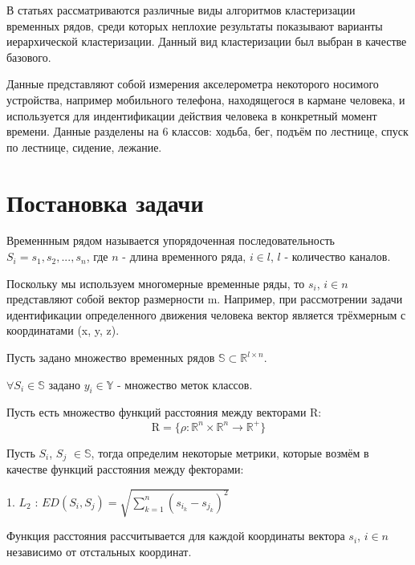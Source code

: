 \documentclass[12pt,twoside]{article}
\begin{document}
        В статьях \cite{WARRENLIAO20051857} \cite{AGHABOZORGI201516} рассматриваются различные виды алгоритмов кластеризации временных рядов,
        среди которых неплохие результаты показывают варианты иерархической кластеризации.
        Данный вид кластеризации был выбран в качестве базового.
        
        Данные \cite{Kwapisz:2011:ARU:1964897.1964918} представляют собой измерения акселерометра некоторого носимого устройства,
        например мобильного телефона, находящегося в кармане человека, и используется для индентификации действия человека в конкретный момент времени.
        Данные разделены на 6 классов: ходьба, бег, подъём по лестнице, спуск по лестнице, сидение, лежание.
                
    \section{Постановка задачи}
		
				Временнным рядом называется упорядоченная последовательность $S_i = s_1,s_2,...,s_n$, где $n$ \-- длина временного ряда, $i\in l$, $l$ \-- количество каналов.
				
				Поскольку мы используем многомерные временные ряды, то $s_i$, $i \in n$ представляют собой вектор размерности m. Например, при рассмотрении задачи идентификации определенного движения человека вектор является трёхмерным с координатами (x, y, z).
        
        Пусть задано множество временных рядов $\mathbb{S} \subset \mathbb{R}^{l \times n}$.

        $\forall S_i \in \mathbb{S}$ задано ${y_i \in \mathbb{Y}}$ \-- множество меток классов.

        Пусть есть множество функций расстояния между векторами $\mathrm{R}$:
        $$
            \mathrm{R} = \{\rho: \mathbb{R}^n \times \mathbb{R}^n \rightarrow \mathbb{R}^+ \}
        $$
				
				Пусть $S_i$, $S_j$ $\in \mathbb{S}$, тогда определим некоторые метрики, которые возмём в качестве функций расстояния между фекторами: 
				
				1. $L_2$ : $ED(S_i, S_j) = \sqrt{\displaystyle\sum_{k = 1}^{n} (s_i_k - s_j_k)^2}$
				
				Функция расстояния рассчитывается для каждой координаты вектора $s_i$, $i \in n$ независимо от отстальных координат.
				
\end{document}
